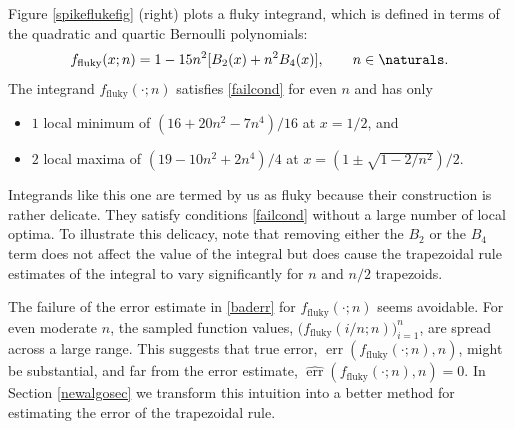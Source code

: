 \documentclass[]{amsart}
\DeclareMathOperator{\err}{err}
\newcommand{\herr}{\widehat{\err}}
\theoremstyle{definition}
\theoremstyle{remark}
\begin{document}
Figure \ref{spikeflukefig} (right) plots a fluky integrand, which is defined in terms of the quadratic and quartic Bernoulli polynomials:
\begin{equation} \label{fluky}
f_{\text{fluky}}(x;n) = 1 - 15 n^2 [B_2(x) + n^2 B_4(x)], \qquad n \in \naturals.
\end{equation}
The integrand $f_{\text{fluky}}(\cdot;n)$ satisfies \eqref{failcond} for even $n$ and has only 
\begin{itemize}
\item $1$ local minimum of $(16 + 20 n^2 - 7 n^4)/16$ at $x=1/2$, and
\item $2$ local maxima of $(19 - 10 n^2 + 2 n^4)/4$ at $x=(1 \pm \sqrt{1 -2/n^2})/2$.
\end{itemize}
Integrands like this one are termed by us as fluky because their construction is rather delicate.  They satisfy conditions \eqref{failcond} without a large number of local optima.  To illustrate this delicacy, note that removing either the $B_2$ or the $B_4$ term does not affect the value of the integral but does cause the trapezoidal rule estimates of the integral to vary significantly for $n$ and $n/2$ trapezoids.

The failure of the error estimate in \eqref{baderr} for $f_{\text{fluky}}(\cdot;n)$ seems avoidable. For even moderate $n$, the sampled function values, $\bigl(f_{\text{fluky}}(i/n;n)\bigr)_{i=1}^{n}$, are spread across a large range.  This suggests that true error, $\err(f_{\text{fluky}}(\cdot;n),n)$, might be substantial, and far from the error estimate, $\herr(f_{\text{fluky}}(\cdot;n),n)=0$.  In Section \ref{newalgosec} we transform this intuition into a better method for estimating the error of the trapezoidal rule.
\end{document}
